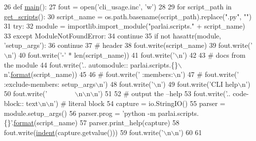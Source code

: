 \begin{DoxyCode}
26 \textcolor{keyword}{def }\hyperlink{namespacegenerate__cli_ac2397b33242e0f40a20f33a2ea5beebf}{main}():
27     fout = open(\textcolor{stringliteral}{'cli\_usage.inc'}, \textcolor{stringliteral}{'w'})
28 
29     \textcolor{keywordflow}{for} script\_path \textcolor{keywordflow}{in} \hyperlink{namespacegenerate__cli_a88235ac81a788e005e9aa0dd7624307c}{get\_scripts}():
30         script\_name = os.path.basename(script\_path).replace(\textcolor{stringliteral}{".py"}, \textcolor{stringliteral}{""})
31         \textcolor{keywordflow}{try}:
32             module = importlib.import\_module(\textcolor{stringliteral}{"parlai.scripts."} + script\_name)
33         \textcolor{keywordflow}{except} ModuleNotFoundError:
34             \textcolor{keywordflow}{continue}
35         \textcolor{keywordflow}{if} \textcolor{keywordflow}{not} hasattr(module, \textcolor{stringliteral}{'setup\_args'}):
36             \textcolor{keywordflow}{continue}
37         \textcolor{comment}{# header}
38         fout.write(script\_name)
39         fout.write(\textcolor{stringliteral}{'\(\backslash\)n'})
40         fout.write(\textcolor{stringliteral}{'-'} * len(script\_name))
41         fout.write(\textcolor{stringliteral}{'\(\backslash\)n'})
42 
43         \textcolor{comment}{# docs from the module}
44         fout.write(\textcolor{stringliteral}{'.. automodule:: parlai.scripts.\{\}\(\backslash\)n'}.\hyperlink{namespaceparlai_1_1chat__service_1_1services_1_1messenger_1_1shared__utils_a32e2e2022b824fbaf80c747160b52a76}{format}(script\_name))
45 
46         \textcolor{comment}{# fout.write('   :members:\(\backslash\)n')}
47         \textcolor{comment}{# fout.write('   :exclude-members: setup\_args\(\backslash\)n')}
48         fout.write(\textcolor{stringliteral}{'\(\backslash\)n'})
49         fout.write(\textcolor{stringliteral}{'CLI help\(\backslash\)n'})
50         fout.write(\textcolor{stringliteral}{'~~~~~~~~\(\backslash\)n\(\backslash\)n\(\backslash\)n'})
51 
52         \textcolor{comment}{# output the --help}
53         fout.write(\textcolor{stringliteral}{'.. code-block:: text\(\backslash\)n\(\backslash\)n'})  \textcolor{comment}{# literal block}
54         capture = io.StringIO()
55         parser = module.setup\_args()
56         parser.prog = \textcolor{stringliteral}{'python -m parlai.scripts.\{\}'}.\hyperlink{namespaceparlai_1_1chat__service_1_1services_1_1messenger_1_1shared__utils_a32e2e2022b824fbaf80c747160b52a76}{format}(script\_name)
57         parser.print\_help(capture)
58         fout.write(\hyperlink{namespacegenerate__cli_a398461fabd4559f4d4d041df98c8cb43}{indent}(capture.getvalue()))
59         fout.write(\textcolor{stringliteral}{'\(\backslash\)n\(\backslash\)n'})
60 
61 
\end{DoxyCode}

